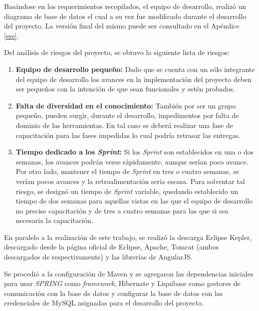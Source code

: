     Basándose en los requerimientos recopilados, el equipo de desarrollo, realizó un diagrama de base de datos el cual a su vez fue modificado durante el desarrollo del proyecto. La versión final del mismo puede ser consultado en el Apéndice \ref{ere}.
    
    Del análisis de riesgos del proyecto, se obtuvo la siguiente lista de riesgos:
    
    \begin{enumerate}
        \item \textbf{Equipo de desarrollo pequeño:} Dado que se cuenta con un sólo integrante del equipo de desarrollo los avances en la implementación del proyecto deben ser pequeños con la intención de que sean funcionales y estén probados.
        \item \textbf{Falta de diversidad en el conocimiento:} También por ser un grupo pequeño, pueden surgir, durante el desarrollo, impedimentos por falta de dominio de las herramientas. En tal caso se deberá realizar una fase de capacitación para las fases impedidas lo cual podría retrasar las entregas.
        \item \textbf{Tiempo dedicado a los \textit{Sprint}:} Si los \textit{Sprint} son establecidos en una o dos semanas, los avances podrán verse rápidamente, aunque serían poco avance. Por otro lado, mantener el tiempo de \textit{Sprint} en tres o cuatro semanas, se verían pocos avances y la retroalimentación sería escasa. Para solventar tal riesgo, se designó un tiempo de \textit{Sprint} variable, quedando establecido un tiempo de dos semanas para aquellas vistas en las que el equipo de desarrollo no precise capacitación y de tres a cuatro semanas para las que si sea necesaria la capacitación.
    \end{enumerate}
    
    En paralelo a la realización de este trabajo, se realizó la descarga Eclipse Kepler, descargado desde la página oficial de Eclipse\cite{ECLIPSE-eclipseorg}, Apache, Tomcat (ambos descargados de \cites{APACHE-maven}{APACHE-tomcat} respectivamente) y las librerías de AngularJS.
    
    Se procedió a la configuración de Maven y se agregaron las dependencias iniciales para usar \textit{SPRING} como \textit{framework}, Hibernate y Liquibase como gestores de comunicación con la base de datos y configurar la base de datos con las credenciales de MySQL asignadas para el desarrollo del proyecto.
    
